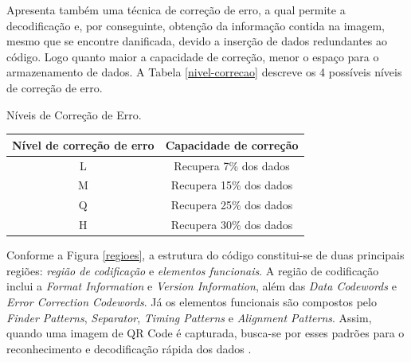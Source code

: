 \documentclass{ceel}
\begin{document}
\begin{multicols}{2}
Apresenta também uma técnica de correção de erro, a qual permite a decodificação e, por conseguinte, obtenção da informação contida na imagem, mesmo que se encontre danificada, devido a inserção de dados redundantes ao código. Logo quanto maior a capacidade de correção, menor o espaço para o armazenamento de dados. A Tabela \ref{nivel-correcao} descreve os 4 possíveis níveis de correção de erro.

\vspace{0.15cm}
\begin{minipage}[h]{\columnwidth}
\begin{scriptsize}
    \def\arraystretch{1.35}
    \captionsetup{type=table}
    \begin{center}
    \caption{Níveis de Correção de Erro.} \label{nivel-correcao}
    \vspace{-0.2cm}
    \begin{tabular}{ c | c } \hline
    \textbf{Nível de correção de erro}&  \textbf{Capacidade de correção}\\\hline
     L & Recupera 7\% dos dados \\
    M & Recupera 15\% dos dados \\
    Q & Recupera 25\% dos dados \\
    H & Recupera 30\% dos dados \\\hline
    \end{tabular}
    \end{center}
\end{scriptsize}
\end{minipage}
\vspace{0.3cm}

Conforme a Figura \ref{regioes}, a estrutura do código constitui-se de duas principais regiões: \textit{região de codificação} e \textit{elementos funcionais}. A região de codificação inclui a \textit{Format Information} e \textit{Version Information}, além das \textit{Data Codewords} e \textit{Error Correction Codewords}. Já os elementos funcionais são compostos pelo \textit{Finder Patterns}, \textit{Separator}, \textit{Timing Patterns} e \textit{Alignment Patterns}. Assim, quando uma imagem de QR Code é capturada, busca-se por esses padrões para o reconhecimento e decodificação rápida dos dados \cite{qr-tutorial}.


\end{multicols}
\end{document}
